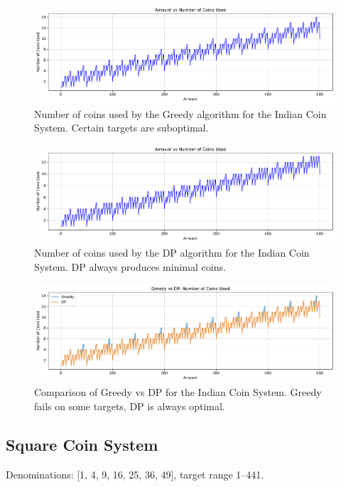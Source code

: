 \documentclass[12pt,a4paper]{report}
\begin{document}
\begin{figure}[H]
  \centering
  \includegraphics[width=\textwidth]{graphs/greedy_coins_indiancoinsystum_plot.pdf}
  \caption{Number of coins used by the Greedy algorithm for the Indian Coin System. Certain targets are suboptimal.}
  \label{fig:greedy_coins_indiancoinsystem_plot}
\end{figure}

\begin{figure}[H]
  \centering
  \includegraphics[width=\textwidth]{graphs/dp_coins_indiancoinsystum_plot.pdf}
  \caption{Number of coins used by the DP algorithm for the Indian Coin System. DP always produces minimal coins.}
  \label{fig:dp_coins_indiancoinsystem_plot}
\end{figure}

\begin{figure}[H]
  \centering
  \includegraphics[width=\textwidth]{graphs/compare_coins_indiancoinsystum_plot.pdf}
  \caption{Comparison of Greedy vs DP for the Indian Coin System. Greedy fails on some targets, DP is always optimal.}
  \label{fig:compare_coins_indiancoinsystem_plot}
\end{figure}


\subsection{Square Coin System}
Denominations: [1, 4, 9, 16, 25, 36, 49], target range 1--441.
\end{document}
